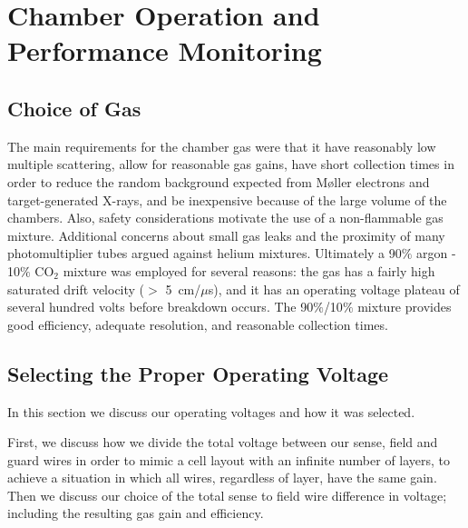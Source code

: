 \section{Chamber Operation and Performance Monitoring}

\subsection{Choice of Gas}
\hskip 0.15in

The main requirements for the chamber gas were that it have reasonably low 
multiple scattering, allow for reasonable gas gains, have short collection 
times in order to reduce the random background expected from M{\o}ller 
electrons and target-generated X-rays, and be inexpensive because of the 
large volume of the chambers. Also, safety considerations motivate the use of
a non-flammable gas mixture.  Additional concerns about small gas 
leaks and the proximity of many photomultiplier tubes argued against helium 
mixtures.  Ultimately a 90$\%$ argon - 10$\%$ CO$_2$ mixture was employed 
for several reasons: the gas has a fairly high saturated drift velocity 
($>$ 5~cm/$\mu$s), and it has an operating voltage plateau of several hundred 
volts before breakdown occurs.  The 90$\%$/10$\%$ mixture 
provides good efficiency, adequate resolution, and reasonable collection times.




\subsection{Selecting the Proper Operating Voltage}
\hskip 0.15in
In this section we discuss our operating voltages and how it was selected.

First, we discuss how we divide the total voltage between our sense, field 
and guard wires in order to mimic a cell layout with an infinite number of
layers, to achieve a situation in which all wires, regardless of layer, have
the same gain.  Then we discuss our choice of the total sense to field
wire difference in voltage; including the resulting gas gain and efficiency.


